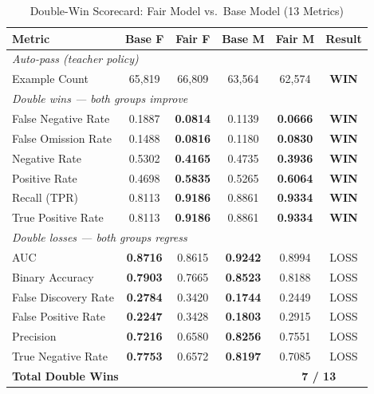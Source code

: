 \documentclass[11pt,a4paper]{article}
\begin{document}
\begin{table}[h]
\centering
\caption{Double-Win Scorecard: Fair Model vs.\ Base Model (13 Metrics)}
\label{tab:double_win_scorecard}
\begin{tabular}{|l|cc|cc|c|}
\hline
\textbf{Metric} &
\textbf{Base F} & \textbf{Fair F} &
\textbf{Base M} & \textbf{Fair M} &
\textbf{Result} \\
\hline
\multicolumn{6}{|l|}{\textit{Auto-pass (teacher policy)}} \\
\hline
Example Count & 65{,}819 & 66{,}809 & 63{,}564 & 62{,}574 & \textbf{WIN} \\
\hline
\multicolumn{6}{|l|}{\textit{Double wins — both groups improve}} \\
\hline
False Negative Rate   & 0.1887 & \textbf{0.0814} & 0.1139 & \textbf{0.0666} & \textbf{WIN} \\
False Omission Rate   & 0.1488 & \textbf{0.0816} & 0.1180 & \textbf{0.0830} & \textbf{WIN} \\
Negative Rate         & 0.5302 & \textbf{0.4165} & 0.4735 & \textbf{0.3936} & \textbf{WIN} \\
Positive Rate         & 0.4698 & \textbf{0.5835} & 0.5265 & \textbf{0.6064} & \textbf{WIN} \\
Recall (TPR)          & 0.8113 & \textbf{0.9186} & 0.8861 & \textbf{0.9334} & \textbf{WIN} \\
True Positive Rate    & 0.8113 & \textbf{0.9186} & 0.8861 & \textbf{0.9334} & \textbf{WIN} \\
\hline
\multicolumn{6}{|l|}{\textit{Double losses — both groups regress}} \\
\hline
AUC                   & \textbf{0.8716} & 0.8615 & \textbf{0.9242} & 0.8994 & LOSS \\
Binary Accuracy       & \textbf{0.7903} & 0.7665 & \textbf{0.8523} & 0.8188 & LOSS \\
False Discovery Rate  & \textbf{0.2784} & 0.3420 & \textbf{0.1744} & 0.2449 & LOSS \\
False Positive Rate   & \textbf{0.2247} & 0.3428 & \textbf{0.1803} & 0.2915 & LOSS \\
Precision             & \textbf{0.7216} & 0.6580 & \textbf{0.8256} & 0.7551 & LOSS \\
True Negative Rate    & \textbf{0.7753} & 0.6572 & \textbf{0.8197} & 0.7085 & LOSS \\
\hline
\multicolumn{4}{|l|}{\textbf{Total Double Wins}} &
\multicolumn{2}{c|}{\textbf{7 / 13}} \\
\hline
\end{tabular}

\end{table}
\end{document}
